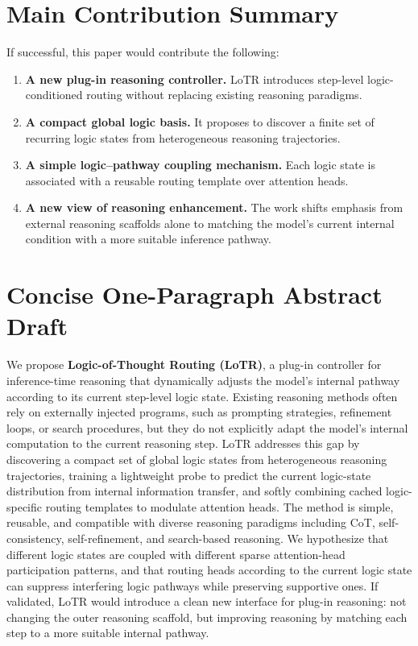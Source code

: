\documentclass[11pt]{article}
\begin{document}
\section{Main Contribution Summary}

If successful, this paper would contribute the following:

\begin{enumerate}[leftmargin=1.5em]
    \item \textbf{A new plug-in reasoning controller.}  
    LoTR introduces step-level logic-conditioned routing without replacing existing reasoning paradigms.
    
    \item \textbf{A compact global logic basis.}  
    It proposes to discover a finite set of recurring logic states from heterogeneous reasoning trajectories.
    
    \item \textbf{A simple logic--pathway coupling mechanism.}  
    Each logic state is associated with a reusable routing template over attention heads.
    
    \item \textbf{A new view of reasoning enhancement.}  
    The work shifts emphasis from external reasoning scaffolds alone to matching the model's current internal condition with a more suitable inference pathway.
\end{enumerate}

\section{Concise One-Paragraph Abstract Draft}

We propose \textbf{Logic-of-Thought Routing (LoTR)}, a plug-in controller for inference-time reasoning that dynamically adjusts the model's internal pathway according to its current step-level logic state. Existing reasoning methods often rely on externally injected programs, such as prompting strategies, refinement loops, or search procedures, but they do not explicitly adapt the model's internal computation to the current reasoning step. LoTR addresses this gap by discovering a compact set of global logic states from heterogeneous reasoning trajectories, training a lightweight probe to predict the current logic-state distribution from internal information transfer, and softly combining cached logic-specific routing templates to modulate attention heads. The method is simple, reusable, and compatible with diverse reasoning paradigms including CoT, self-consistency, self-refinement, and search-based reasoning. We hypothesize that different logic states are coupled with different sparse attention-head participation patterns, and that routing heads according to the current logic state can suppress interfering logic pathways while preserving supportive ones. If validated, LoTR would introduce a clean new interface for plug-in reasoning: not changing the outer reasoning scaffold, but improving reasoning by matching each step to a more suitable internal pathway.
\end{document}
